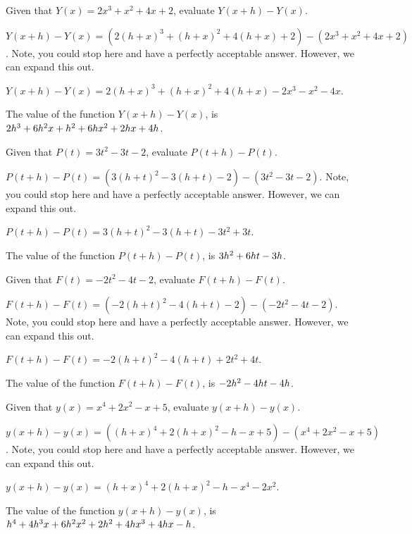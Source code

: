 \begin{shuffle}
\begin{exercise}
Given that $Y(x)=2 x^3+x^2+4 x+2$, evaluate $Y(x+h)-Y(x)$.
\begin{solution}
\begin{hint}
$Y(x+h)-Y(x)=(2 (h+x)^3+(h+x)^2+4 (h+x)+2)-(2 x^3+x^2+4 x+2)$. Note, you could stop here and have a perfectly acceptable answer. However, we can expand this out.
\end{hint}
\begin{hint}
$Y(x+h)-Y(x)=2 (h+x)^3+(h+x)^2+4 (h+x)-2 x^3-x^2-4 x$.
\end{hint}
The value of the function $Y(x+h)-Y(x)$, is ${2 h^3+6 h^2 x+h^2+6 h x^2+2 h x+4 h}$.
\end{solution}
\end{exercise}

\begin{exercise}
Given that $P(t)=3 t^2-3 t-2$, evaluate $P(t+h)-P(t)$.
\begin{solution}
\begin{hint}
$P(t+h)-P(t)=(3 (h+t)^2-3 (h+t)-2)-(3 t^2-3 t-2)$. Note, you could stop here and have a perfectly acceptable answer. However, we can expand this out.
\end{hint}
\begin{hint}
$P(t+h)-P(t)=3 (h+t)^2-3 (h+t)-3 t^2+3 t$.
\end{hint}
The value of the function $P(t+h)-P(t)$, is ${3 h^2+6 h t-3 h}$.
\end{solution}
\end{exercise}

\begin{exercise}
Given that $F(t)=-2 t^2-4 t-2$, evaluate $F(t+h)-F(t)$.
\begin{solution}
\begin{hint}
$F(t+h)-F(t)=(-2 (h+t)^2-4 (h+t)-2)-(-2 t^2-4 t-2)$. Note, you could stop here and have a perfectly acceptable answer. However, we can expand this out.
\end{hint}
\begin{hint}
$F(t+h)-F(t)=-2 (h+t)^2-4 (h+t)+2 t^2+4 t$.
\end{hint}
The value of the function $F(t+h)-F(t)$, is ${-2 h^2-4 h t-4 h}$.
\end{solution}
\end{exercise}

\begin{exercise}
Given that $y(x)=x^4+2 x^2-x+5$, evaluate $y(x+h)-y(x)$.
\begin{solution}
\begin{hint}
$y(x+h)-y(x)=((h+x)^4+2 (h+x)^2-h-x+5)-(x^4+2 x^2-x+5)$. Note, you could stop here and have a perfectly acceptable answer. However, we can expand this out.
\end{hint}
\begin{hint}
$y(x+h)-y(x)=(h+x)^4+2 (h+x)^2-h-x^4-2 x^2$.
\end{hint}
The value of the function $y(x+h)-y(x)$, is ${h^4+4 h^3 x+6 h^2 x^2+2 h^2+4 h x^3+4 h x-h}$.
\end{solution}
\end{exercise}


\end{shuffle}

